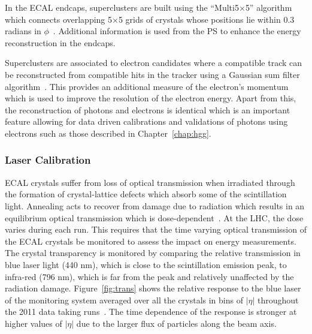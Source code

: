 In the ECAL endcaps, superclusters are built using the ``Multi5$\times$5'' algorithm which 
connects overlapping 5$\times$5 grids of crystals whose positions lie within 
0.3 radians in $\phi$~\citep{AN-09-164}. 
Additional information is used from the PS to enhance the energy reconstruction in the endcaps. 

Superclusters are associated to electron candidates 
where a compatible track can be reconstructed from
compatible hits in the tracker using a Gaussian sum filter algorithm~\citep{GSF_Electron_Reconstruction_CMS}.  
This provides an additional measure of the electron's momentum which is used 
to improve the resolution of the electron energy.
Apart from this, the reconstruction of photons and electrons is identical which is an 
important feature allowing for data driven calibrations and validations of photons using 
electrons such as those described in Chapter~\ref{chap:hgg}.


\subsubsection{Laser Calibration}

ECAL crystals suffer from loss of optical transmission when irradiated through 
the formation of crystal-lattice defects which absorb some of the scintillation light. Annealing
acts to recover from damage due to radiation which results in an equilibrium optical 
transmission which is dose-dependent~\citep{TDR1}. 
At the LHC, the dose varies during each run. This requires that the time varying optical transmission of the ECAL 
crystals be monitored to assess the impact on energy measurements.
The crystal transparency is monitored by comparing the relative transmission in blue laser light (440 nm), 
which is close to the scintillation emission peak, to infra-red (796 nm), which is far from the 
peak and relatively unaffected by the radiation damage.
Figure~\ref{fig:trans} shows the relative response to the blue laser of the monitoring system
averaged over all the crystals in bins of $|\eta|$ throughout the 2011 data taking 
runs~\citep{CMS-DP-2012-007}. 
The time dependence of the response is stronger at higher values of $|\eta|$ due to the larger flux
of particles along the beam axis.


